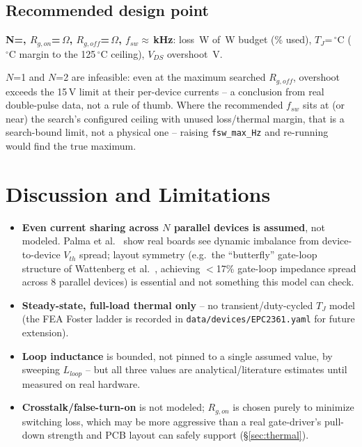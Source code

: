 \documentclass[10pt,twocolumn]{article}
\newcommand{\ohm}{\ensuremath{\Omega}}
\newcommand{\degC}{\ensuremath{^{\circ}\mathrm{C}}}
\begin{document}


\subsection{Recommended design point}

\textbf{N=\NVAL{}, $R_{g,on}$=\RGONVAL\,\ohm, $R_{g,off}$=\RGOFFVAL\,\ohm,
$f_{sw}\approx$\FSWVAL\,kHz}: loss \PTOTALVAL\,W of \PBUDGETVAL\,W budget
(\PCTVAL\% used), $T_J$=\TJVAL\,\degC{} (\MARGINVAL\,\degC{} margin to the 125\,\degC{}
ceiling), $V_{DS}$ overshoot \OVSVAL\,V.

$N$=1 and $N$=2 are infeasible: even at the maximum searched $R_{g,off}$, overshoot
exceeds the 15\,V limit at their per-device currents -- a conclusion from real
double-pulse data, not a rule of thumb. Where the recommended $f_{sw}$ sits at (or near)
the search's configured ceiling with unused loss/thermal margin, that is a
search-bound limit, not a physical one -- raising \texttt{fsw\_max\_Hz} and re-running
would find the true maximum.

\section{Discussion and Limitations}

\begin{itemize}[leftmargin=1.2em,itemsep=1pt]
\item \textbf{Even current sharing across $N$ parallel devices is assumed}, not modeled.
  Palma et al.~\cite{palma2024} show real boards see dynamic imbalance from
  device-to-device $V_{th}$ spread; layout symmetry (e.g.\ the ``butterfly'' gate-loop
  structure of Wattenberg et al.~\cite{wattenberg2023}, achieving $<$17\% gate-loop
  impedance spread across 8 parallel devices) is essential and not something this model
  can check.
\item \textbf{Steady-state, full-load thermal only} -- no transient/duty-cycled $T_J$
  model (the FEA Foster ladder is recorded in \texttt{data/devices/EPC2361.yaml} for
  future extension).
\item \textbf{Loop inductance} is bounded, not pinned to a single assumed value, by
  sweeping $L_{loop}$ -- but all three values are analytical/literature estimates until
  measured on real hardware.
\item \textbf{Crosstalk/false-turn-on} is not modeled; $R_{g,on}$ is chosen purely to
  minimize switching loss, which may be more aggressive than a real gate-driver's
  pull-down strength and PCB layout can safely support (\S\ref{sec:thermal}).
\end{itemize}
\end{document}
